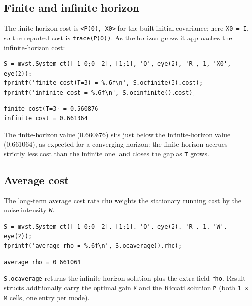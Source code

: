 \documentclass[11pt,oneside]{report}
\newcommand{\code}[1]{\texttt{#1}}
\begin{document}
\hypertarget{finite-and-infinite-horizon}{%
\subsection{Finite and infinite horizon}\label{finite-and-infinite-horizon}}

The finite-horizon cost is \code{\textless{}P(0), X0\textgreater{}} for the built initial covariance; here
\code{X0 = I}, so the reported cost is \code{trace(P(0))}. As the horizon grows it
approaches the infinite-horizon cost:

\begin{lstlisting}[style=matlabstyle]
S = mvst.System.ct([-1 0;0 -2], [1;1], 'Q', eye(2), 'R', 1, 'X0', eye(2));
fprintf('finite cost(T=3) = %.6f\n', S.ocfinite(3).cost);
fprintf('infinite cost = %.6f\n', S.ocinfinite().cost);
\end{lstlisting}

\begin{lstlisting}[style=outputstyle]
finite cost(T=3) = 0.660876
infinite cost = 0.661064
\end{lstlisting}

The finite-horizon value (0.660876) sits just below the infinite-horizon value
(0.661064), as expected for a converging horizon: the finite horizon accrues
strictly less cost than the infinite one, and closes the gap as \code{T} grows.

\hypertarget{average-cost}{%
\subsection{Average cost}\label{average-cost}}

The long-term average cost rate \code{rho} weights the stationary running cost by the
noise intensity \code{W}:

\begin{lstlisting}[style=matlabstyle]
S = mvst.System.ct([-1 0;0 -2], [1;1], 'Q', eye(2), 'R', 1, 'W', eye(2));
fprintf('average rho = %.6f\n', S.ocaverage().rho);
\end{lstlisting}

\begin{lstlisting}[style=outputstyle]
average rho = 0.661064
\end{lstlisting}

\code{S.ocaverage} returns the infinite-horizon solution plus the extra field
\code{rho}. Result structs additionally carry the optimal gain \code{K} and the Riccati
solution \code{P} (both \code{1 x M} cells, one entry per mode).
\end{document}
